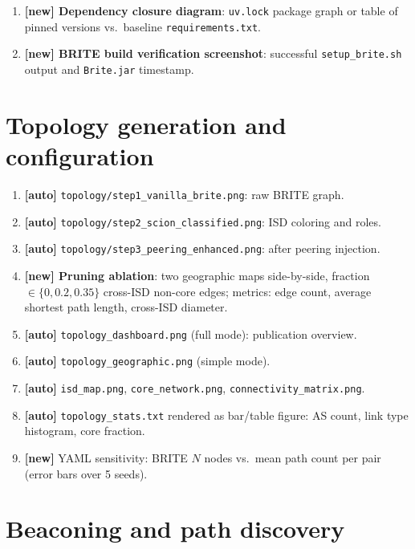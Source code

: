 \documentclass[11pt,a4paper,twoside,openright]{report}
\begin{document}
\begin{enumerate}
  \item \textbf{[new] Dependency closure diagram}: \texttt{uv.lock} package graph
    or table of pinned versions vs.\ baseline \texttt{requirements.txt}.
  \item \textbf{[new] BRITE build verification screenshot}: successful
    \texttt{setup\_brite.sh} output and \texttt{Brite.jar} timestamp.
\end{enumerate}

\section{Topology generation and configuration}

\begin{enumerate}[resume]
  \item \textbf{[auto]} \texttt{topology/step1\_vanilla\_brite.png}: raw BRITE graph.
  \item \textbf{[auto]} \texttt{topology/step2\_scion\_classified.png}: ISD coloring and roles.
  \item \textbf{[auto]} \texttt{topology/step3\_peering\_enhanced.png}: after peering injection.
  \item \textbf{[new] Pruning ablation}: two geographic maps side-by-side,
    fraction $\in \{0, 0.2, 0.35\}$ cross-ISD non-core edges; metrics: edge count,
    average shortest path length, cross-ISD diameter.
  \item \textbf{[auto]} \texttt{topology\_dashboard.png} (full mode): publication overview.
  \item \textbf{[auto]} \texttt{topology\_geographic.png} (simple mode).
  \item \textbf{[auto]} \texttt{isd\_map.png}, \texttt{core\_network.png},
    \texttt{connectivity\_matrix.png}.
  \item \textbf{[auto]} \texttt{topology\_stats.txt} rendered as bar/table figure:
    AS count, link type histogram, core fraction.
  \item \textbf{[new]} YAML sensitivity: BRITE $N$ nodes vs.\ mean path count per pair
    (error bars over 5 seeds).
\end{enumerate}

\section{Beaconing and path discovery}
\end{document}
